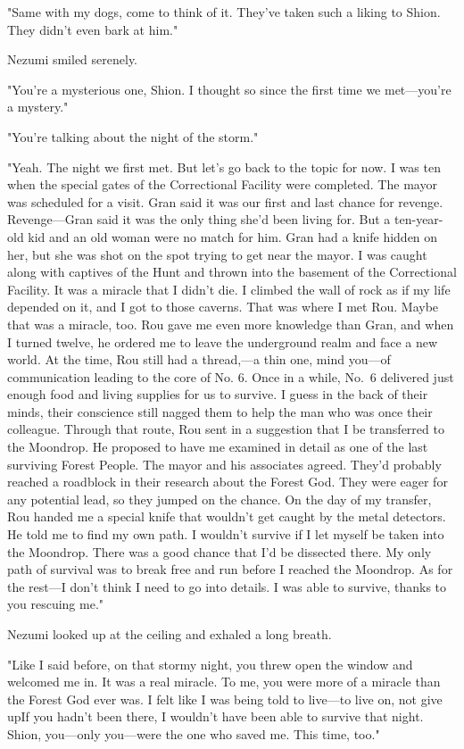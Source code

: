 "Same with my dogs, come to think of it. They've taken such a liking to
Shion. They didn't even bark at him."

Nezumi smiled serenely.

"You're a mysterious one, Shion. I thought so since the first time we
met---you're a mystery."

"You're talking about the night of the storm."

"Yeah. The night we first met. But let's go back to the topic for now. I
was ten when the special gates of the Correctional Facility were
completed. The mayor was scheduled for a visit. Gran said it was our
first and last chance for revenge. Revenge---Gran said it was the only
thing she'd been living for. But a ten-year-old kid and an old woman
were no match for him. Gran had a knife hidden on her, but she was shot
on the spot trying to get near the mayor. I was caught along with
captives of the Hunt and thrown into the basement of the Correctional
Facility. It was a miracle that I didn't die. I climbed the wall of rock
as if my life depended on it, and I got to those caverns. That was where
I met Rou. Maybe that was a miracle, too. Rou gave me even more
knowledge than Gran, and when I turned twelve, he ordered me to leave
the underground realm and face a new world. At the time, Rou still had a
thread,---a thin one, mind you---of communication leading to the core of No.
6. Once in a while, No.~6 delivered just enough food and living supplies
for us to survive. I guess in the back of their minds, their conscience
still nagged them to help the man who was once their colleague. Through
that route, Rou sent in a suggestion that I be transferred to the
Moondrop. He proposed to have me examined in detail as one of the last
surviving Forest People. The mayor and his associates agreed. They'd
probably reached a roadblock in their research about the Forest God.
They were eager for any potential lead, so they jumped on the chance. On
the day of my transfer, Rou handed me a special knife that wouldn't get
caught by the metal detectors. He told me to find my own path. I
wouldn't survive if I let myself be taken into the Moondrop. There was a
good chance that I'd be dissected there. My only path of survival was to
break free and run before I reached the Moondrop. As for the rest---I
don't think I need to go into details. I was able to survive, thanks to
you rescuing me."

Nezumi looked up at the ceiling and exhaled a long breath.

"Like I said before, on that stormy night, you threw open the window and
welcomed me in. It was a real miracle. To me, you were more of a miracle
than the Forest God ever was. I felt like I was being told to live---to
live on, not give up\el If you hadn't been there, I wouldn't have been
able to survive that night. Shion, you---only you---were the one who saved
me. This time, too."

